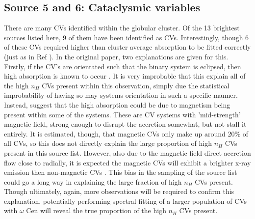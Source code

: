 \documentclass[aps,
                pra,  
                a4paper, 
                amsmath, 
                amssymb, 
                preprint,
                tightenlines,  
                amsfonts,
                nofootinbib,
                notitlepage
            ]{revtex4-2}
\begin{document}
\subsection{Source 5 and 6: Cataclysmic variables}
There are many CVs identified within the globular cluster. Of the 13 brightest sources listed here, 9 of them have been identified as CVs. Interestingly, though 6 of these CVs required higher than cluster average absorption to be fitted correctly (just as in Ref \cite{Henleywillis2018}). In the original paper, two explanations are given for this. Firstly, if the CV's are orientated such that the binary system is eclipsed, then high absorption is known to occur \cite{Heinke2005}. It is very improbable that this explain all of the high $n_H$ CVs present within this observation, simply due the statistical improbability of having so may systems orientation in such a specific manner. Instead, \cite{Henleywillis2018} suggest that the high absorption could be due to magnetism being present within some of the systems. These are CV systems with 'mid-strength' magnetic field, strong enough to disrupt the accretion somewhat, but not stall it entirely. It is estimated, though, that magnetic CVs only make up around 20\% of all CVs, so this does not directly explain the large proportion of high $n_H$ CVs present in this source list. However, also due to the magnetic field direct accretion flow close to radially, it is expected the magnetic CVs will exhibit a brighter x-ray emission then non-magnetic CVs \cite{Pretorius2013}. This bias in the sampling of the source list could go a long way in explaining the large fraction of high $n_H$ CVs present. Though ultimately, again, more observations will be required to confirm this explanation, potentially performing spectral fitting of a larger population of CVs with $\omega$ Cen will reveal the true proportion of the high $n_H$ CVs present.
\end{document}
